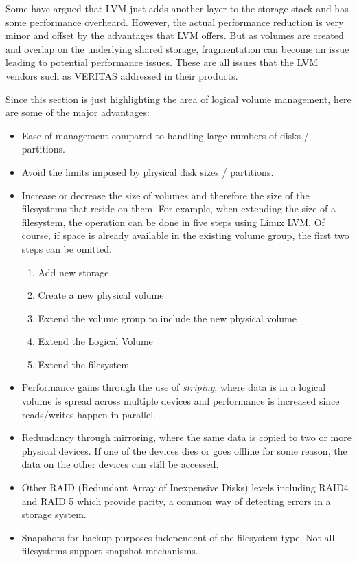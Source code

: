 Some have argued that LVM just adds another layer to the storage stack and has some performance overheard. However, the actual performance reduction is very minor and offset by the advantages that LVM offers. But as volumes are created and overlap on the underlying shared storage, fragmentation can become an issue leading to potential performance issues. These are all issues that the LVM vendors such as VERITAS addressed in their products.

Since this section is just highlighting the area of logical volume management, here are some of the major advantages:

\begin{itemize}
	\item Ease of management compared to handling large numbers of disks / partitions.
	\item Avoid the limits imposed by physical disk sizes / partitions.
	\item Increase or decrease the size of volumes and therefore the size of the filesystems that reside on them. For example,
		when extending the size of a filesystem, the operation can be done in five steps using Linux LVM. 
		Of course, if space is already available in the existing volume group, the first two steps can be omitted. 
	\begin{enumerate}
			\item Add new storage
			\item Create a new physical volume
			\item Extend the volume group to include the new physical volume
			\item Extend the Logical Volume 
			\item Extend the filesystem
		\end{enumerate}
	\item Performance gains through the use of \textit{striping}, where data is in a logical volume is spread across multiple
		devices and performance is increased since reads/writes happen in parallel.
	\item Redundancy through mirroring, where the same data is copied to two or more physical devices. If one of the devices
		dies or goes offline for some reason, the data on the other devices can still be accessed.
	\item Other RAID (Redundant Array of Inexpensive Disks) levels including RAID4 and RAID 5 which provide parity,
		a common way of detecting errors in a storage system. 
	\item Snapshots for backup purposes independent of the filesystem type. Not all filesystems support snapshot mechanisms.
\end{itemize}

